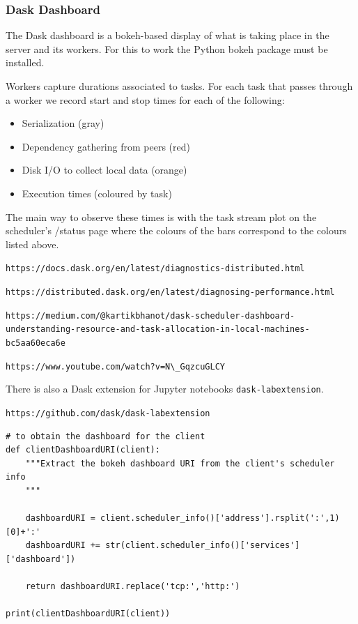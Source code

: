 \subsubsection{Dask Dashboard}
\label{sec:DaskDashboard}

The Dask dashboard is a bokeh-based display of what is taking place in the server and its workers. For this to work the Python bokeh package must be installed.


Workers capture durations associated to tasks. For each task that passes through a worker we record start and stop times for each of the following:


\begin{itemize}
\item Serialization (gray)
\item Dependency gathering from peers (red)
\item Disk I/O to collect local data (orange)
\item Execution times (coloured by task)
\end{itemize}

The main way to observe these times is with the task stream plot on the scheduler's /status page where the colours of the bars correspond to the colours listed above.


\lstinline{https://docs.dask.org/en/latest/diagnostics-distributed.html}


\lstinline{https://distributed.dask.org/en/latest/diagnosing-performance.html}


\lstinline{https://medium.com/@kartikbhanot/dask-scheduler-dashboard-understanding-resource-and-task-allocation-in-local-machines-bc5aa60eca6e}


\lstinline{https://www.youtube.com/watch?v=N\_GqzcuGLCY}


There is also a Dask extension for Jupyter notebooks \verb+dask-labextension+.


\lstinline{https://github.com/dask/dask-labextension}



\begin{lstlisting}[style=incellstyle]
# to obtain the dashboard for the client
def clientDashboardURI(client):
    """Extract the bokeh dashboard URI from the client's scheduler info
    """
    
    dashboardURI = client.scheduler_info()['address'].rsplit(':',1)[0]+':'
    dashboardURI += str(client.scheduler_info()['services']['dashboard'])
    
    return dashboardURI.replace('tcp:','http:')

print(clientDashboardURI(client))
\end{lstlisting}


